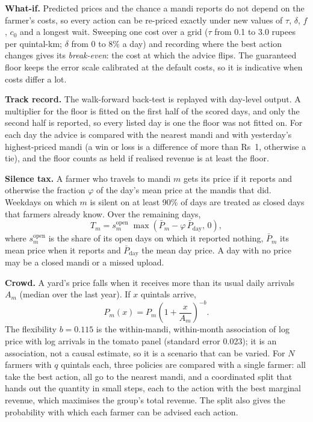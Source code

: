 \noindent\textbf{What-if.} Predicted prices and the chance a mandi reports do not depend on the farmer's costs, so every action can be re-priced exactly under new values of $\tau$, $\delta$, $f$, $c_0$ and a longest wait. Sweeping one cost over a grid ($\tau$ from 0.1 to 3.0 rupees per quintal-km; $\delta$ from 0 to 8\% a day) and recording where the best action changes gives its \emph{break-even}: the cost at which the advice flips. The guaranteed floor keeps the error scale calibrated at the default costs, so it is indicative when costs differ a lot.

\noindent\textbf{Track record.} The walk-forward back-test is replayed with day-level output. A multiplier for the floor is fitted on the first half of the scored days, and only the second half is reported, so every listed day is one the floor was not fitted on. For each day the advice is compared with the nearest mandi and with yesterday's highest-priced mandi (a win or loss is a difference of more than Rs~1, otherwise a tie), and the floor counts as held if realised revenue is at least the floor.

\noindent\textbf{Silence tax.} A farmer who travels to mandi $m$ gets its price if it reports and otherwise the fraction $\varphi$ of the day's mean price at the mandis that did. Weekdays on which $m$ is silent on at least 90\% of days are treated as closed days that farmers already know. Over the remaining days,
\begin{equation}
T_m = s_m^{\mathrm{open}}\;\max\!\left(\bar P_m - \varphi\,\bar P_{\mathrm{day}},\,0\right),
\label{eq:silence}
\end{equation}
where $s_m^{\mathrm{open}}$ is the share of its open days on which it reported nothing, $\bar P_m$ its mean price when it reports and $\bar P_{\mathrm{day}}$ the mean day price. A day with no price may be a closed mandi or a missed upload.

\noindent\textbf{Crowd.} A yard's price falls when it receives more than its usual daily arrivals $A_m$ (median over the last year). If $x$ quintals arrive,
\begin{equation}
P_m(x) = P_m\left(1+\frac{x}{A_m}\right)^{-b}.
\label{eq:crowd}
\end{equation}
The flexibility $b=0.115$ is the within-mandi, within-month association of log price with log arrivals in the tomato panel (standard error 0.023); it is an association, not a causal estimate, so it is a scenario that can be varied. For $N$ farmers with $q$ quintals each, three policies are compared with a single farmer: all take the best action, all go to the nearest mandi, and a coordinated split that hands out the quantity in small steps, each to the action with the best marginal revenue, which maximises the group's total revenue. The split also gives the probability with which each farmer can be advised each action.

